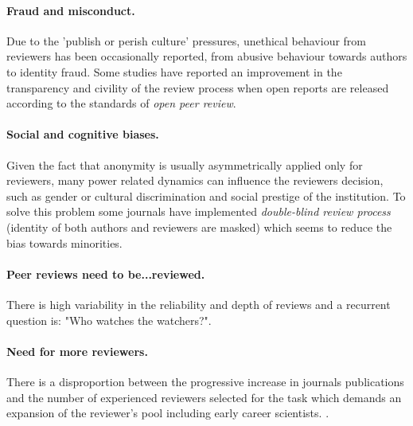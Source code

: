 \documentclass[runningheads]{llncs}
\begin{document}
\paragraph{Fraud and misconduct.} Due to the 'publish or perish culture' pressures, unethical behaviour from reviewers has been occasionally reported, from abusive behaviour towards authors \cite{Smith2006,tragedy-reviewers} to identity fraud. Some studies have reported an improvement in the transparency and civility of the review process when open reports are released according to the standards of \emph{open peer review}.
\paragraph{Social and cognitive biases.} Given the fact that anonymity is usually asymmetrically applied only for reviewers, many power related dynamics can influence the reviewers decision, such as gender or cultural discrimination and social prestige of the institution. To solve this problem some journals have implemented \emph{double-blind review process} (identity of both authors and reviewers are masked) which seems to reduce the bias towards minorities.
\paragraph{Peer reviews need to be...reviewed.} There is high variability in the reliability and depth of reviews and a recurrent question is: "Who watches the watchers?".
\paragraph{Need for more reviewers.} There is a disproportion between the progressive increase in journals publications and the number of experienced reviewers selected for the task which demands an expansion of the reviewer's pool including early career scientists. \cite{tragedy-reviewers}.
\end{document}
